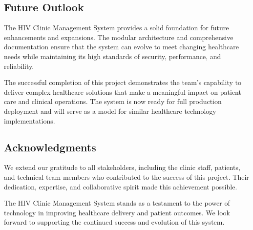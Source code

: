 \documentclass[12pt,a4paper]{article}
\begin{document}
\subsection{Future Outlook}

The HIV Clinic Management System provides a solid foundation for future enhancements and expansions. The modular architecture and comprehensive documentation ensure that the system can evolve to meet changing healthcare needs while maintaining its high standards of security, performance, and reliability.

The successful completion of this project demonstrates the team's capability to deliver complex healthcare solutions that make a meaningful impact on patient care and clinical operations. The system is now ready for full production deployment and will serve as a model for similar healthcare technology implementations.

\subsection{Acknowledgments}

We extend our gratitude to all stakeholders, including the clinic staff, patients, and technical team members who contributed to the success of this project. Their dedication, expertise, and collaborative spirit made this achievement possible.

The HIV Clinic Management System stands as a testament to the power of technology in improving healthcare delivery and patient outcomes. We look forward to supporting the continued success and evolution of this system.
\end{document}
